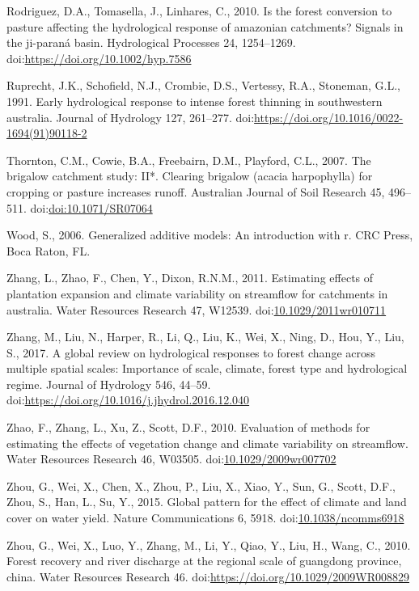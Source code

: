 \documentclass[]{elsarticle} %
\begin{document}
\leavevmode\hypertarget{ref-rodriguez2010}{}%
Rodriguez, D.A., Tomasella, J., Linhares, C., 2010. Is the forest
conversion to pasture affecting the hydrological response of amazonian
catchments? Signals in the ji-paraná basin. Hydrological Processes 24,
1254--1269.
doi:\href{https://doi.org/https://doi.org/10.1002/hyp.7586}{https://doi.org/10.1002/hyp.7586}

\leavevmode\hypertarget{ref-ruprechtetal1991}{}%
Ruprecht, J.K., Schofield, N.J., Crombie, D.S., Vertessy, R.A.,
Stoneman, G.L., 1991. Early hydrological response to intense forest
thinning in southwestern australia. Journal of Hydrology 127, 261--277.
doi:\href{https://doi.org/https://doi.org/10.1016/0022-1694(91)90118-2}{https://doi.org/10.1016/0022-1694(91)90118-2}

\leavevmode\hypertarget{ref-thornton2007}{}%
Thornton, C.M., Cowie, B.A., Freebairn, D.M., Playford, C.L., 2007. The
brigalow catchment study: II*. Clearing brigalow (acacia harpophylla)
for cropping or pasture increases runoff. Australian Journal of Soil
Research 45, 496--511.
doi:\href{https://doi.org/doi:10.1071/SR07064}{doi:10.1071/SR07064}

\leavevmode\hypertarget{ref-wood2006}{}%
Wood, S., 2006. Generalized additive models: An introduction with r. CRC
Press, Boca Raton, FL.

\leavevmode\hypertarget{ref-zhang2011}{}%
Zhang, L., Zhao, F., Chen, Y., Dixon, R.N.M., 2011. Estimating effects
of plantation expansion and climate variability on streamflow for
catchments in australia. Water Resources Research 47, W12539.
doi:\href{https://doi.org/10.1029/2011wr010711}{10.1029/2011wr010711}

\leavevmode\hypertarget{ref-zhang2017}{}%
Zhang, M., Liu, N., Harper, R., Li, Q., Liu, K., Wei, X., Ning, D., Hou,
Y., Liu, S., 2017. A global review on hydrological responses to forest
change across multiple spatial scales: Importance of scale, climate,
forest type and hydrological regime. Journal of Hydrology 546, 44--59.
doi:\href{https://doi.org/https://doi.org/10.1016/j.jhydrol.2016.12.040}{https://doi.org/10.1016/j.jhydrol.2016.12.040}

\leavevmode\hypertarget{ref-zhao2010}{}%
Zhao, F., Zhang, L., Xu, Z., Scott, D.F., 2010. Evaluation of methods
for estimating the effects of vegetation change and climate variability
on streamflow. Water Resources Research 46, W03505.
doi:\href{https://doi.org/10.1029/2009wr007702}{10.1029/2009wr007702}

\leavevmode\hypertarget{ref-zhou2015}{}%
Zhou, G., Wei, X., Chen, X., Zhou, P., Liu, X., Xiao, Y., Sun, G.,
Scott, D.F., Zhou, S., Han, L., Su, Y., 2015. Global pattern for the
effect of climate and land cover on water yield. Nature Communications
6, 5918.
doi:\href{https://doi.org/10.1038/ncomms6918}{10.1038/ncomms6918}

\leavevmode\hypertarget{ref-zhou2010}{}%
Zhou, G., Wei, X., Luo, Y., Zhang, M., Li, Y., Qiao, Y., Liu, H., Wang,
C., 2010. Forest recovery and river discharge at the regional scale of
guangdong province, china. Water Resources Research 46.
doi:\href{https://doi.org/https://doi.org/10.1029/2009WR008829}{https://doi.org/10.1029/2009WR008829}
\end{document}
